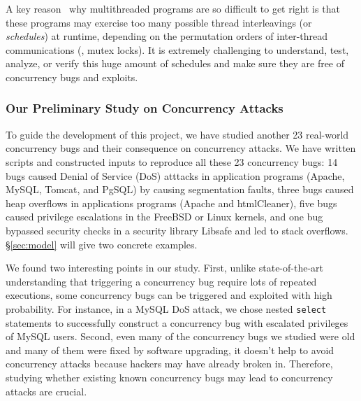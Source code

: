 A key reason~\cite{smt:cacm, parrot:sosp13} why multithreaded programs are so 
difficult to get right is that these programs may exercise too many 
possible thread interleavings (or \emph{schedules}) at runtime, depending on 
the permutation orders of inter-thread communications (\eg, mutex 
locks). It is extremely challenging to understand, test, analyze, or verify 
this huge amount of schedules and make sure they are free of concurrency bugs 
and exploits.

\subsubsection{Our Preliminary Study on Concurrency Attacks} 
\label{sec:out-study}

To guide the development of this \xxx project, we have studied another 23 
real-world concurrency bugs and their consequence on concurrency attacks. We 
have written scripts and constructed inputs to reproduce all these 23 
concurrency bugs: 14 bugs caused Denial of Service (DoS) atttacks in application 
programs (Apache, MySQL, Tomcat, and PgSQL) by causing segmentation faults, 
three bugs caused heap overflows in applications programs (Apache and 
htmlCleaner), five bugs caused privilege escalations in the FreeBSD or Linux 
kernels, and one bug bypassed security checks in a security library Libsafe and 
led to stack overflows. \S\ref{sec:model} will give two concrete 
examples.

We found two interesting points in our study. First, unlike 
state-of-the-art understanding that triggering a concurrency bug require lots of 
repeated executions, some concurrency bugs can be triggered and exploited with 
high probability. For instance, in a MySQL DoS attack, we chose nested 
\texttt{select} statements to successfully construct a concurrency bug with 
escalated privileges of MySQL users. Second, even many of the concurrency bugs 
we studied were old and many of them were fixed by software upgrading, it 
doesn't help to avoid concurrency attacks because hackers may have already 
broken in. Therefore, studying whether existing known concurrency bugs may lead 
to concurrency attacks are crucial.




